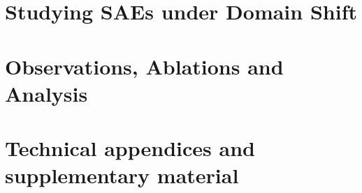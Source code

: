 \documentclass{article}
\begin{document}
\section{Studying SAEs under Domain Shift}
\vspace{-6pt}


\section{Observations, Ablations and Analysis}
\vspace{-6pt}


 





\newpage
\appendix

\section{Technical appendices and supplementary material}









\end{document}
